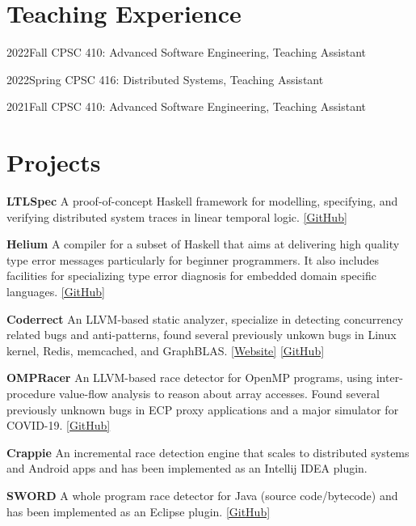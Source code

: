 \documentclass[12pt,letterpaper]{report}
\newcommand{\listtabwidth}{1.75cm}
\begin{document}
\section*{Teaching Experience}
\renewcommand{\listtabwidth}{2.5cm}
\begin{tablist}
	\item[2022Fall] \tab CPSC 410: Advanced Software Engineering, Teaching Assistant
	\item[2022Spring] \tab CPSC 416: Distributed Systems, Teaching Assistant
	\item[2021Fall] \tab CPSC 410: Advanced Software Engineering, Teaching Assistant
\end{tablist}
\renewcommand{\listtabwidth}{1.75cm}

\vspace{-0.5em}

\renewcommand{\listtabwidth}{2.5cm}
\section*{Projects}

\begin{tablist}
	\item[\textbf{LTLSpec}]
	\tab A proof-of-concept Haskell framework for modelling, specifying, and verifying distributed system traces in linear temporal logic.
	\href{https://github.com/ejconlon/ltlspec}{[GitHub]}
	\item[\textbf{Helium}]
	\tab A compiler for a subset of Haskell that aims at delivering high quality type error messages particularly for beginner programmers. It also includes facilities for specializing type error diagnosis for embedded domain specific languages. \href{https://github.com/Helium4Haskell/helium}{[GitHub]}
	\item[\textbf{Coderrect}]
	\tab An LLVM-based static analyzer, specialize in detecting concurrency related bugs and anti-patterns, found several previously unkown bugs in Linux kernel, Redis, memcached, and GraphBLAS. \href{https://coderrect.com/}{[Website]} \href{https://github.com/jtao/OpenRace}{[GitHub]}
	\item[\textbf{OMPRacer}]
	\tab An LLVM-based race detector for OpenMP programs,
	using inter-procedure value-flow analysis to reason about array accesses.
	Found several previously unknown bugs in ECP proxy applications and a major simulator for COVID-19. \href{https://github.com/parasol-aser/OMPRacer}{[GitHub]}
	\item[\textbf{Crappie}]
	\tab An incremental race detection engine that scales to distributed systems and Android apps and has been implemented as an Intellij IDEA plugin.
	\item[\textbf{SWORD}]
	\tab A whole program race detector for Java (source code/bytecode) and has been implemented as an Eclipse plugin. \href{https://github.com/funemy/SWORD}{[GitHub]}
\end{tablist}
\renewcommand{\listtabwidth}{1.75cm}
\end{document}
